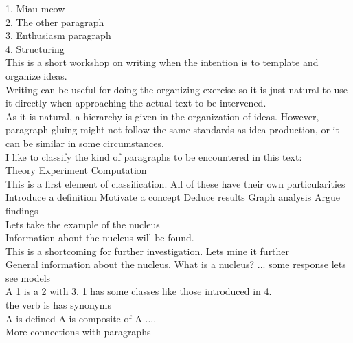 \documentclass[openany]{book}
\begin{document}
1.	Miau meow \\
2.	The other paragraph  \\
3.	Enthusiasm paragraph  \\
4.	Structuring \\

This is a short workshop on writing when the intention is to template and organize ideas.  \\

Writing can be useful for doing the organizing exercise so it is just natural to use it directly when approaching the actual text to be intervened.  \\

As it is natural, a hierarchy is given in the organization of ideas. However, paragraph gluing might not follow the same standards as idea production, or it can be similar in some circumstances.  \\

I like to classify the kind of paragraphs to be encountered in this text:  \\

Theory  
Experiment 
Computation \\

This is a first element of classification. All of these have their own particularities  \\

Introduce a definition  
Motivate a concept
Deduce results
Graph analysis 
Argue findings  \\

Lets take the example of the nucleus  \\
 
Information about the nucleus will be found.  \\
 
This is a shortcoming for further investigation. Lets mine it further  \\

General information about the nucleus. 
	What is a nucleus? ... some response lets see models  \\
	
	A 1 is a 2 with 3. 1 has some classes like those introduced in 4.  \\
	
	the verb is has synonyms \\
	
	A is defined
	A is composite of 
	A ....  \\
	
	More connections with paragraphs \\
	 
\end{document}
